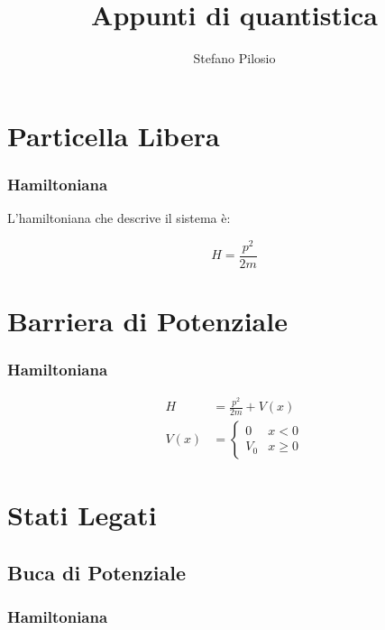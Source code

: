 \documentclass[a4paper]{scrreport}
\begin{document}
\author{Stefano Pilosio}
\title{Appunti di quantistica}

\maketitle

\tableofcontents

\chapter{Particella Libera}

\subsection{Hamiltoniana}

L'hamiltoniana che descrive il sistema è:

\begin{equation}
    H = \frac{ p^ 2}{2m}
\end{equation}

\chapter{Barriera di Potenziale}

\subsection{Hamiltoniana}

\begin{align}
    H    & = \frac{ p^ 2}{2m} + V(x)\\
    V(x) & = 
    \begin{cases}
    0   & x < 0\\
    V_0 & x \ge 0   
    \end{cases}
\end{align}

\chapter{Stati Legati}

\section{Buca di Potenziale}

\subsection{Hamiltoniana}
\end{document}
